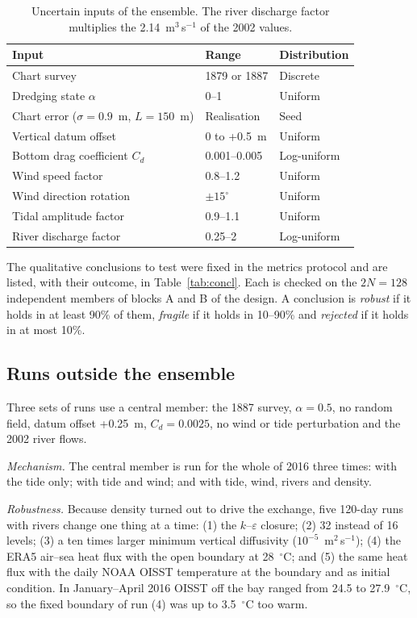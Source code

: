 \documentclass[a4paper,fleqn]{ems-dc}
\begin{document}
\begin{table}[!t]
\centering
\caption{Uncertain inputs of the ensemble. The river discharge factor multiplies the
2.14~m$^3$\,s$^{-1}$ of the 2002 values.}\label{tab:params}
\begin{tabular}{lll}
\toprule
Input & Range & Distribution\\
\midrule
Chart survey & 1879 or 1887 & Discrete\\
Dredging state $\alpha$ & 0--1 & Uniform\\
Chart error ($\sigma = 0.9$~m, $L = 150$~m) & Realisation & Seed\\
Vertical datum offset & 0 to +0.5~m & Uniform\\
Bottom drag coefficient $C_d$ & 0.001--0.005 & Log-uniform\\
Wind speed factor & 0.8--1.2 & Uniform\\
Wind direction rotation & $\pm 15^\circ$ & Uniform\\
Tidal amplitude factor & 0.9--1.1 & Uniform\\
River discharge factor & 0.25--2 & Log-uniform\\
\bottomrule
\end{tabular}
\end{table}

The qualitative conclusions to test were fixed in the metrics protocol and are listed, with
their outcome, in Table~\ref{tab:concl}. Each is checked on the $2N = 128$ independent
members of blocks A and B of the design. A conclusion is \emph{robust} if it holds in at least
90\% of them, \emph{fragile} if it holds in 10--90\% and \emph{rejected} if it holds in at
most 10\%.

\subsection{Runs outside the ensemble}\label{sec:extra}
Three sets of runs use a central member: the 1887 survey, $\alpha = 0.5$, no random field,
datum offset +0.25~m, $C_d = 0.0025$, no wind or tide perturbation and the 2002 river flows.

\emph{Mechanism.} The central member is run for the whole of 2016 three times: with the tide
only; with tide and wind; and with tide, wind, rivers and density.

\emph{Robustness.} Because density turned out to drive the exchange, five 120-day runs with
rivers change one thing at a time: (1) the $k$--$\varepsilon$ closure; (2) 32 instead of 16
levels; (3) a ten times larger minimum vertical diffusivity ($10^{-5}$~m$^2$\,s$^{-1}$); (4) the
ERA5 air--sea heat flux with the open boundary at 28~$^\circ$C; and (5) the same heat flux with
the daily NOAA OISST temperature \citep{Huang2021} at the boundary and as initial condition.
In January--April 2016 OISST off the bay ranged from 24.5 to 27.9~$^\circ$C, so the fixed
boundary of run (4) was up to 3.5~$^\circ$C too warm.
\end{document}

